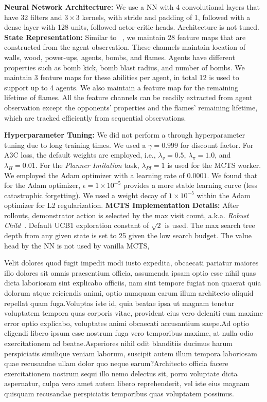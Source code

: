 \documentclass[letterpaper]{article}
\begin{document}
\textbf{Neural Network Architecture:} We use a NN with 4 convolutional layers that have 32 filters and $3 \times 3$ kernels, with stride and padding of 1, followed with a dense layer with 128 units, followed actor-critic heads. Architecture is not tuned.  \textbf{State Representation:} Similar to ~\cite{resnick2018pommerman}, we maintain 28 feature maps that are constructed from the agent observation. These channels maintain location of walls, wood, power-ups, agents, bombs, and flames. Agents have different properties such as bomb kick, bomb blast radius, and number of bombs. We maintain 3 feature maps for these abilities per agent, in total 12 is used to support up to 4 agents. We also maintain a feature map for the remaining lifetime of flames. All the feature channels can be readily extracted from agent observation except the opponents' properties and the flames' remaining lifetime, which are tracked efficiently from sequential observations.

\textbf{Hyperparameter Tuning:} We did not perform a through hyperparameter tuning due to long training times. We used a $\gamma=0.999$ for discount factor. For A3C loss, the default weights are employed, i.e., $\lambda_{v}=0.5$, $\lambda_{\pi}=1.0$, and $\lambda_{H}=0.01$. For the \emph{Planner Imitation} task, $\lambda_{PI}=1$ is used for the MCTS worker. We employed the Adam optimizer with a learning rate of $0.0001$. We found that for the Adam optimizer, $\epsilon = 1\times10^{-5}$ provides a more stable learning curve (less catastrophic forgetting). We used a weight decay of $1\times10^{-5}$ within the Adam optimizer for L2 regularization.  \textbf{MCTS Implementation Details:} After rollouts, demonstrator action is selected by the max visit count, a.k.a. \textit{Robust Child}~\cite{browne2012survey}. Default UCB1 exploration constant of $\sqrt{2}$ is used. The max search tree depth from any given state is set to 25 given the low search budget. The value head by the NN is not used by vanilla MCTS, %



\small
Velit dolores quod fugit impedit modi iusto expedita, obcaecati pariatur maiores illo dolores sit omnis praesentium officia, assumenda ipsam optio esse nihil quas dicta laboriosam sint explicabo officiis, nam sint tempore fugiat non quaerat quia dolorum atque reiciendis animi, optio numquam earum illum architecto aliquid repellat quam fuga.Voluptas iste id, quia beatae ipsa ut magnam tenetur voluptatem tempora quas corporis vitae, provident eius vero deleniti eum maxime error optio explicabo, voluptates animi obcaecati accusantium saepe.Ad optio eligendi libero ipsum esse nostrum fuga vero temporibus maxime, at nulla odio exercitationem ad beatae.Asperiores nihil odit blanditiis ducimus harum perspiciatis similique veniam laborum, suscipit autem illum tempora laboriosam quae recusandae ullam dolor quo neque earum?Architecto officia facere exercitationem nostrum sequi illo nemo delectus sit, porro voluptate dicta aspernatur, culpa vero amet autem libero reprehenderit, vel iste eius magnam quisquam recusandae perspiciatis temporibus quas voluptatem possimus.\clearpage

\end{document}
